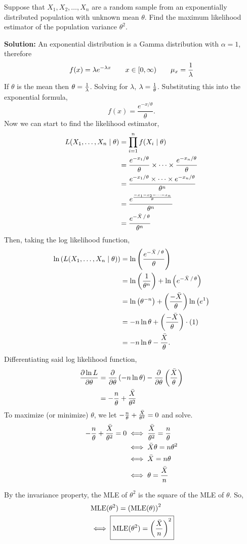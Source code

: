 Suppose that $X_1, X_2, \dots, X_n$ are a random sample from an exponentially distributed population with unknown mean $\theta$. Find the maximum likelihood estimator of the population variance $\theta^2$. 

\nnl \textbf{Solution: } An exponential distribution is a Gamma distribution with $\alpha = 1$, therefore
$$f(x) = \lambda e^{-\lambda x} \qquad x \in [0, \infty) \qquad \mu_x = \over{\lambda}$$
If $\theta$ is the mean then $\theta = \over{\lambda}$. Solving for $\lambda$, $\lambda = \over{\theta}$. Substituting this into the exponential formula,
$$f(x) = \frac{e^{-x / \theta}}{\theta}.$$
Now we can start to find the likelihood estimator,
\begin{align*}
    L(\thru{X} \mid \theta) &= \prod_{i=1}^n f(X_i \mid \theta)\\
    &= \frac{e^{-x_1/\theta}}{\theta} \times \cdots \times \frac{e^{-x_n/\theta}}{\theta}\\
    &= \frac{e^{-x_1/\theta} \times \cdots \times e^{-x_n/\theta  }}{\theta^n}\\
    &= \frac{e^{\frac{-x_1 - x_2 - \cdots - x_n}{\theta}}}{\theta^n}\\
    &= \frac{e^{-\xbar\,/\,\theta}}{\theta^n}
\end{align*}
Then, taking the log likelihood function,
\begin{align*}
    \ln \pars{L(\thru{X} \mid \theta)} &= \ln \pars{ \frac{e^{-\xbar\,/\,\theta}}{\theta}}\\
    &= \ln \pover{\theta^n} + \ln \pars{e^{-\xbar\,/\,\theta}}\\
    &=  \ln \pars{\theta^{-n}} + \pfrac{-\xbar}{\theta}\ln \pars{e^1}\\
    &= -n \ln \theta + \pfrac{-\xbar}{\theta}\cdot (1)\\
    &= -n \ln \theta - \frac{\xbar}{\theta}.
\end{align*}
Differentiating said log likelihood function,
\begin{align*}
    \pdv{\ln L}{\theta} &= \pdv{}{\theta}\pars{-n\ln \theta} - \pdv{}{\theta}\pfrac{\xbar}{\theta}\\
    &= -\frac{n}{\theta} + \frac{\xbar}{\theta^2}
\end{align*}
To maximize (or minimize) $\theta$, we let $-\frac{n}{\theta} + \frac{\xbar}{\theta^2} = 0$ and solve.
\begin{align*}
    -\frac{n}{\theta} + \frac{\xbar}{\theta^2} = 0 &\iff \frac{\xbar}{\theta^2} = \frac{n}{\theta} \\
    &\iff \xbar \theta = n\theta^2\\
    &\iff \xbar = n\theta\\
    &\iff \theta = \frac{\xbar}{n}
\end{align*}

\nl By the invariance property, the MLE of $\theta^2$ is the square of the MLE of $\theta$. So,
\begin{align*}
    & \operatorname{MLE}(\theta^2) = \pars{\operatorname{MLE}(\theta)}^2\\
    & \iff \boxed{\operatorname{MLE}(\theta^2) = \pars{ \frac{\xbar}{n}}^2}
\end{align*}
